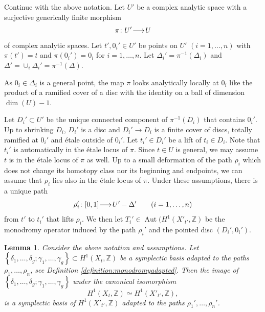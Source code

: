 \documentclass[a4paper,11pt,reqno]{amsart}
\makeatletter
\numberwithin{equation}{section}
\theoremstyle{plain}
\newtheorem{lemma}[theorem]{Lemma}
\theoremstyle{definition}
\newcommand{\Z}{\mathbb Z}
\newcommand{\Aut}{\operatorname{Aut}}
\renewcommand{\longrightarrow}{\xymatrix@1@=15pt{\ar[r]&}}
\renewcommand{\cong}{\simeq}
\newcommand{\set}[1]{\left\{ #1 \right\}}
\makeatother
\begin{document}
Continue with the above notation. Let $U'$ be a complex analytic space with a surjective generically finite morphism 
$$
\pi \colon U' \longrightarrow U
$$ 
of complex analytic spaces.
Let $t', 0_i' \in U'$ be points on $U'$ $(i = 1, \dotsc, n)$ with $\pi(t') = t$ and $\pi(0_i') = 0_i$ for $i = 1, \dotsc, n$. 
Let $\Delta_i' = \pi^{-1}(\Delta_i)$ 
and $\Delta' = \cup_i \Delta_i' = \pi^{-1}(\Delta)$. 

As $0_i \in \Delta_i$ is a general point, the map $\pi$ looks analytically locally at $0_i$ like the product of a ramified cover of a disc with the identity on a ball of dimension $\dim(U)-1$.

Let $D_i' \subset U'$ be the unique connected component of $\pi^{-1}(D_i)$ that contains $0_i'$.
Up to shrinking $D_i$, $D_i'$ is a disc and $D_i' \to D_i$ is a finite cover of discs, totally ramified at $0_i'$ and \'etale outside of $0_i'$. 
Let $t_i'\in D_i'$ be a lift of $t_i\in D_i$. 
Note that $t_i'$ is automatically in the \'etale locus of $\pi$.
Since $t\in U$ is general, we may assume $t$ is in the \'etale locus of $\pi$ as well.
Up to a small deformation of the path $\rho_i$ 
which does not change its homotopy class nor its beginning and endpoints, we can assume that $\rho_i$ lies also in the \'etale locus of $\pi$.
Under these assumptions, there is a unique path  $$\rho_i' \colon [0,1] \longrightarrow U' - \Delta' \quad \quad (i = 1, \dotsc, n)$$ from $t'$ to $t_i'$ that lifts $\rho_i$.
We then let $T_i' \in \Aut(H^1(X'_{t'},\Z)$ be the monodromy operator induced by the path $\rho_i'$ and the pointed disc $(D_i', 0_i')$. 
 
 \begin{lemma} \label{lemma:adapted-monodromy-basechange}
 Consider the above notation and assumptions. Let $\set{\delta_1, \dotsc, \delta_g;\gamma_1, \dotsc, \gamma_g} \subset  H^1(X_t,\Z)$ be a symplectic basis adapted to the paths $\rho_1, \dotsc, \rho_n$, see Definition \ref{definition:monodromyadapted}. Then the image of $\set{\delta_1, \dotsc, \delta_g;\gamma_1, \dotsc, \gamma_g}$ under the canonical isomorphism
\[
H^1(X_t,\Z) \cong H^1(X'_{t'},\Z),
\]
is a symplectic basis of $H^1(X'_{t'},\Z)$ adapted to the paths $\rho_1', \dotsc, \rho_n'$.  
\end{lemma}
\end{document}
